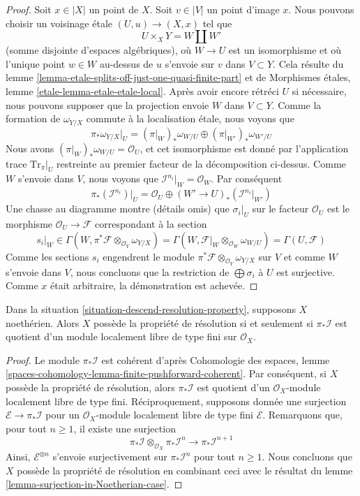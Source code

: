 \begin{proof}
\medskip\noindent
Soit $x \in |X|$ un point de $X$. Soit $v \in |V|$ un point d'image $x$.
Nous pouvons choisir un voisinage \'etale $(U, u) \to (X, x)$ tel que
$$
U \times_X Y = W \coprod W'
$$
(somme disjointe d'espaces algébriques), où $W \to U$ est un
isomorphisme et où l'unique point $w \in W$ au-dessus de
$u$ s'envoie sur $v$ dans $V \subset Y$. Cela résulte du
lemme \ref{lemma-etale-splits-off-just-one-quasi-finite-part} et de
Morphismes \'etales, lemme \ref{etale-lemma-etale-etale-local}.
Après avoir encore rétréci $U$ si nécessaire, nous pouvons supposer que la projection envoie $W$ dans
$V \subset Y$. Comme la formation de $\omega_{Y/X}$
commute à la localisation \'etale, nous voyons que
$$
\pi_*\omega_{Y/X}|_U = (\pi|_W)_*\omega_{W/U} \oplus (\pi|_{W'})_*\omega_{W'/U}
$$
Nous avons $(\pi|_W)_*\omega_{W/U} = \mathcal{O}_U$, et cet isomorphisme
est donné par l'application trace $\text{Tr}_\pi|_U$ restreinte
au premier facteur de la décomposition ci-dessus. Comme $W$ s'envoie
dans $V$, nous voyons que $\mathcal{I}^{n_i}|_W = \mathcal{O}_W$.
Par conséquent
$$
\pi_*(\mathcal{I}^{n_i})|_U = \mathcal{O}_U \oplus
(W' \to U)_*(\mathcal{I}^{n_i}|_{W'})
$$
Une chasse au diagramme montre (détails omis) que $\sigma_i|_U$
sur le facteur $\mathcal{O}_U$ est le morphisme $\mathcal{O}_U \to \mathcal{F}$
correspondant à la section
$$
s_i|_W  \in
\Gamma(W,\pi^*\mathcal{F} \otimes_{\mathcal{O}_Y} \omega_{Y/X})
=
\Gamma(W, \mathcal{F}|_W \otimes_{\mathcal{O}_W} \omega_{W/U})
=
\Gamma(U, \mathcal{F})
$$
Comme les sections $s_i$ engendrent le module
$\pi^*\mathcal{F} \otimes_{\mathcal{O}_Y} \omega_{Y/X}$
sur $V$ et comme $W$ s'envoie dans $V$, nous concluons
que la restriction de $\bigoplus \sigma_i$ à $U$ est surjective.
Comme $x$ était arbitraire, la démonstration est achevée.
\end{proof}

\begin{lemma}
\label{lemma-resolution-property-in-Noetherian-case}
Dans la situation \ref{situation-descend-resolution-property}, supposons
$X$ noethérien. Alors $X$ possède la propriété de résolution si et seulement
si $\pi_*\mathcal{I}$ est quotient d'un module localement libre de type fini
sur $\mathcal{O}_X$.
\end{lemma}

\begin{proof}
Le module $\pi_*\mathcal{I}$ est cohérent d'après
Cohomologie des espaces, lemme
\ref{spaces-cohomology-lemma-finite-pushforward-coherent}.
Par conséquent, si $X$ possède la propriété de résolution, alors $\pi_*\mathcal{I}$
est quotient d'un $\mathcal{O}_X$-module localement libre de type fini.
Réciproquement, supposons donnée une surjection $\mathcal{E} \to \pi_*\mathcal{I}$
pour un $\mathcal{O}_X$-module localement libre de type fini $\mathcal{E}$.
Remarquons que, pour tout $n \geq 1$, il existe une surjection
$$
\pi_*\mathcal{I} \otimes_{\mathcal{O}_X} \pi_*\mathcal{I}^n
\longrightarrow
\pi_*\mathcal{I}^{n + 1}
$$
Ainsi, $\mathcal{E}^{\otimes n}$ s'envoie surjectivement sur
$\pi_*\mathcal{I}^n$ pour tout $n \geq 1$. Nous concluons que $X$
possède la propriété de résolution en combinant ceci avec le
résultat du lemme \ref{lemma-surjection-in-Noetherian-case}.
\end{proof}

